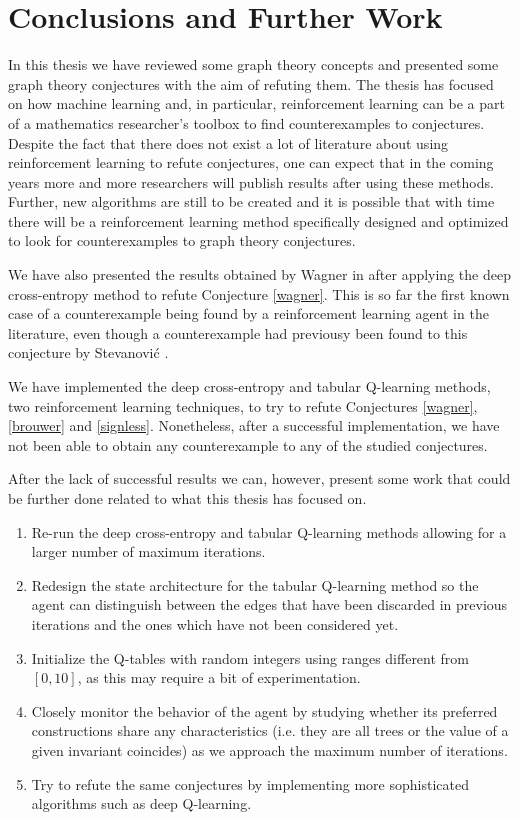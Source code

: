 \documentclass[11pt]{article}
\theoremstyle{definition}
\begin{document}
\newpage

\section{Conclusions and Further Work} \label{conclusions}

In this thesis we have reviewed some graph theory concepts and presented some graph theory conjectures with the aim of refuting them. The thesis has focused on how machine learning and, in particular, reinforcement learning can be a part of a mathematics researcher's toolbox to find counterexamples to conjectures. Despite the fact that there does not exist a lot of literature about using reinforcement learning to refute conjectures, one can expect that in the coming years more and more researchers will publish results after using these methods. Further, new algorithms are still to be created and it is possible that with time there will be a reinforcement learning method specifically designed and optimized to look for counterexamples to graph theory conjectures. 

We have also presented the results obtained by Wagner in \cite{Wagner:2021} after applying the deep cross-entropy method to refute Conjecture \ref{wagner}. This is so far the first known case of a counterexample being found by a reinforcement learning agent in the literature, even though a counterexample had previousy been found to this conjecture by Stevanović \cite{zbMATH05804421}.

We have implemented the deep cross-entropy and tabular Q-learning methods, two reinforcement learning techniques, to try to refute Conjectures \ref{wagner}, \ref{brouwer} and \ref{signless}. Nonetheless, after a successful implementation, we have not been able to obtain any counterexample to any of the studied conjectures. 

After the lack of successful results we can, however, present some work that could be further done related to what this thesis has focused on.

\begin{enumerate}[label=\roman*.]
    \item Re-run the deep cross-entropy and tabular Q-learning methods allowing for a larger number of maximum iterations. 
    \item Redesign the state architecture for the tabular Q-learning method so the agent can distinguish between the edges that have been discarded in previous iterations and the ones which have not been considered yet. 
    \item Initialize the Q-tables with random integers using ranges different from $[0, 10]$, as this may require a bit of experimentation.
    \item Closely monitor the behavior of the agent by studying whether its preferred constructions share any characteristics (i.e. they are all trees or the value of a given invariant coincides) as we approach the maximum number of iterations.
    \item Try to refute the same conjectures by implementing more sophisticated algorithms such as deep Q-learning.
\end{enumerate}
\end{document}
